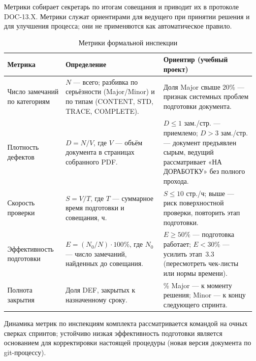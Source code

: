 \documentclass[12pt,a4paper]{article}
\begin{document}
Метрики собирает секретарь по итогам совещания и приводит их в протоколе
DOC-13.X. Метрики служат ориентирами для ведущего при принятии решения и
для улучшения процесса; они не применяются как автоматическое правило.

\begin{table}[h!]
  \centering
  \caption{Метрики формальной инспекции}
  \label{tab:metrics}
  \begin{tabularx}{\textwidth}{
    >{\raggedright\arraybackslash}p{3.4cm}
    >{\raggedright\arraybackslash}X
    >{\raggedright\arraybackslash}p{4.6cm}}
    \toprule
    \textbf{Метрика} & \textbf{Определение} & \textbf{Ориентир (учебный проект)} \\
    \midrule
    Число замечаний по категориям &
    $N$ --- всего; разбивка по серьёзности (Major/Minor) и по типам
    (CONTENT, STD, TRACE, COMPLETE). &
    Доля Major свыше 20\% --- признак системных проблем подготовки документа. \\
    \addlinespace
    Плотность дефектов &
    $D = N/V$, где $V$ --- объём документа в страницах собранного PDF. &
    $D \le 1$ зам./стр. --- приемлемо; $D > 3$ зам./стр. --- документ предъявлен
    сырым, ведущий рассматривает «НА ДОРАБОТКУ» без полного прохода. \\
    \addlinespace
    Скорость проверки &
    $S = V/T$, где $T$ --- суммарное время подготовки и совещания, ч. &
    $S \le 10$ стр./ч; выше --- риск поверхностной проверки, повторить этап
    подготовки. \\
    \addlinespace
    Эффективность подготовки &
    $E = (N_{0}/N)\cdot100\%$, где $N_{0}$ --- число замечаний, найденных до
    совещания. &
    $E \ge 50\%$ --- подготовка работает; $E < 30\%$ --- усилить этап~3.3
    (пересмотреть чек-листы или нормы времени). \\
    \addlinespace
    Полнота закрытия &
    Доля DEF, закрытых к назначенному сроку. &
    100\% Major --- к моменту решения; Minor --- к концу следующего спринта. \\
    \bottomrule
  \end{tabularx}
\end{table}

Динамика метрик по инспекциям комплекта рассматривается командой на очных
сверках спринтов; устойчиво низкая эффективность подготовки является основанием
для корректировки настоящей процедуры (новая версия документа по git-процессу).

\appendix
\end{document}
